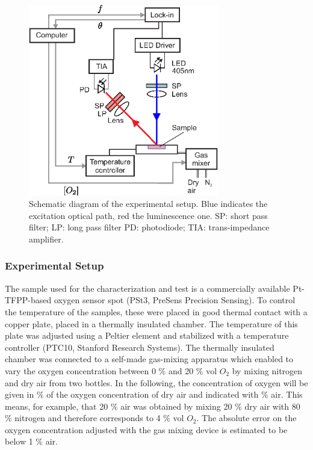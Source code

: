 \documentclass[9pt,twocolumn,twoside,pdftex]{optica}
\begin{document}
\begin{figure}[t!]
\centering
\includegraphics[keepaspectratio, width=8.3cm]{Setup_auto.eps}
\caption{Schematic diagram of the experimental setup. Blue indicates the excitation optical path, red the luminescence one. SP: short pass filter; LP: long pass filter PD: photodiode; TIA: trans-impedance amplifier.}
\label{fig:setup}
\end{figure}


\subsubsection{Experimental Setup}

The sample used for the characterization and test is a commercially available Pt-TFPP-based oxygen sensor spot (PSt3, PreSens Precision Sensing).
To control the temperature of the samples, these were placed in good thermal contact with a copper plate, placed in a thermally insulated chamber. The temperature of this plate was adjusted using a Peltier element and stabilized with a temperature controller (PTC10, Stanford Research Systems). The thermally insulated chamber was connected to a self-made gas-mixing apparatus which enabled to vary the oxygen concentration between 0 $\%$ and 20 $\%$ vol $O_2$ by mixing nitrogen and dry air from two bottles. In the following, the concentration of oxygen will be given in $\%$ of the oxygen concentration of dry air and indicated with $\%$ air. This means, for example, that 20 $\%$ air was obtained by mixing 20 $\%$ dry air with 80 $\%$ nitrogen and therefore corresponds to 4 $\%$ vol $O_2$. The absolute error on the oxygen concentration adjusted with the gas mixing device is estimated to be below 1 $\%$ air. 
 
\end{document}
